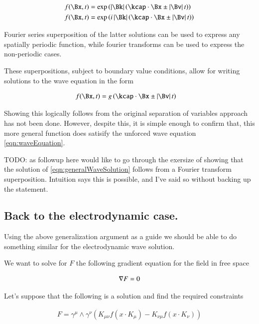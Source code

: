 \documentclass{article}
\begin{document}
\begin{align*}
f(\Bx,t) &= \exp\left( \Abs{\Bk}\left( \kcap \cdot \Bx \pm \Abs{\Bv} t \right) \right) \\
f(\Bx,t) &= \exp\left( i \Abs{\Bk}\left( \kcap \cdot \Bx \pm \Abs{\Bv} t \right) \right)
\end{align*}

Fourier series superposition of the latter solutions can be used to express any spatially periodic function, while fourier transforms 
can be used to express the non-periodic cases.

These superpositions, subject to boundary value conditions, allow for writing solutions to the wave equation in the form

\begin{align}\label{eqn:generalWaveSolution}
f(\Bx,t) &= g\left( \kcap \cdot \Bx \pm \Abs{\Bv} t \right)
\end{align}

Showing this logically follows from the original separation of variables approach has not been done.   However, despite this,
it is
simple enough to confirm that,
this more general function does satisify the unforced wave equation \ref{eqn:waveEquation}.

TODO: as followup here would like to go through the exersize of showing 
that the solution of \ref{eqn:generalWaveSolution} follows from a Fourier transform superposition.  Intuition says this is
possible, and I've said so without backing up the statement.

\subsection{ Back to the electrodynamic case. }

Using the above generalization argument as a guide we should be able to do something similar for the electrodynamic wave solution.

We want to solve for $F$ the following gradient equation for the field in free space

\begin{align}\label{eqn:maxwell}
\nabla F = 0
\end{align}

Let's suppose that the following is a solution and find the required constraints

\begin{align}\label{eqn:testSol}
F = \gamma^\mu \wedge \gamma^\nu \left( K_{\mu\nu} f( x \cdot K_\mu ) -K_{\nu\mu} f( x \cdot K_\nu ) \right)
\end{align}
\end{document}
